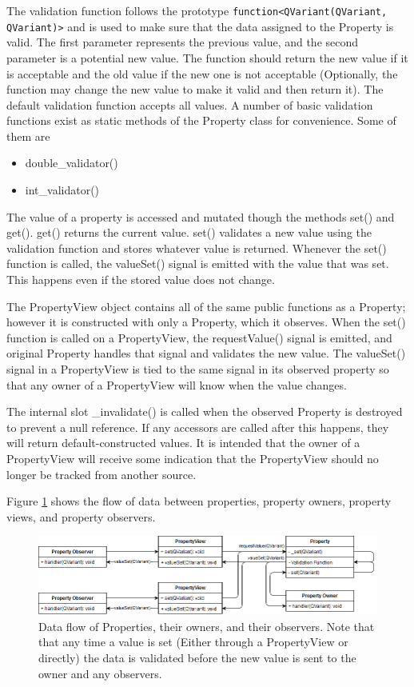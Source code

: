  	The validation function follows the prototype \lstinline|function<QVariant(QVariant, QVariant)>| and is used to make sure that the data assigned to the Property is valid. The first parameter represents the previous value, and the second parameter is a potential new value. The function should return the new value if it is acceptable and the old value if the new one is not acceptable (Optionally, the function may change the new value to make it valid and then return it). The default validation function accepts all values. A number of basic validation functions exist as static methods of the Property class for convenience. Some of them are
 	\begin{itemize}
 		\item double\_validator()
 		\item int\_validator()
 	\end{itemize}
 	
 	The value of a property is accessed and mutated though the methods set() and get(). get() returns the current value. set() validates a new value using the validation function and stores whatever value is returned. Whenever the set() function is called, the valueSet() signal is emitted with the value that was set. This happens even if the stored value does not change.
 	
 	The PropertyView object contains all of the same public functions as a Property; however it is constructed with only a Property, which it observes. When the set() function is called on a PropertyView, the requestValue() signal is emitted, and original Property handles that signal and validates the new value. The valueSet() signal in a PropertyView is tied to the same signal in its observed property so that any owner of a PropertyView will know when the value changes.
 	
 	The internal slot \_invalidate() is called when the observed Property is destroyed to prevent a null reference. If any accessors are called after this happens, they will return default-constructed values. It is intended that the owner of a PropertyView will receive some indication that the PropertyView should no longer be tracked from another source.
 	
 	Figure \ref{uml:dataflow_property} shows the flow of data between properties, property owners, property views, and property observers.
 	
 \begin{figure}[h]
 	\begin{center}
 	\includegraphics[scale=0.5]{./images_design/uml/DataFlow_Property}
 	\caption{Data flow of Properties, their owners, and their observers. Note that that any time a value is set (Either through a PropertyView or directly) the data is validated before the new value is sent to the owner and any observers.\label{uml:dataflow_property}}
 	\end{center}
 \end{figure} 
 	
